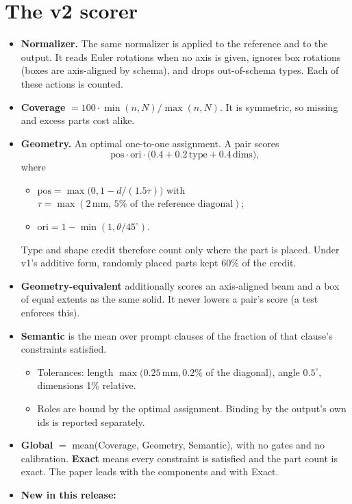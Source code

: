 \documentclass[10pt,a4paper]{article}
\begin{document}
\section{The v2 scorer}
\begin{itemize}
\item \textbf{Normalizer.} The same normalizer is applied to the reference and to the output. It reads Euler rotations when no axis is given, ignores box rotations (boxes are axis-aligned by schema), and drops out-of-schema types. Each of these actions is counted.
\item \textbf{Coverage} $=100\cdot\min(n,N)/\max(n,N)$. It is symmetric, so missing and excess parts cost alike.
\item \textbf{Geometry.} An optimal one-to-one assignment. A pair scores
  \[ \text{pos}\cdot\text{ori}\cdot\bigl(0.4+0.2\,\text{type}+0.4\,\text{dims}\bigr), \]
  where
  \begin{itemize}
  \item $\text{pos}=\max\!\bigl(0,1-d/(1.5\tau)\bigr)$ with $\tau=\max(2\,\text{mm},\,5\%\text{ of the reference diagonal})$;
  \item $\text{ori}=1-\min(1,\theta/45^\circ)$.
  \end{itemize}
  Type and shape credit therefore count only where the part is placed. Under v1's additive form, randomly placed parts kept 60\% of the credit.
\item \textbf{Geometry-equivalent} additionally scores an axis-aligned beam and a box of equal extents as the same solid. It never lowers a pair's score (a test enforces this).
\item \textbf{Semantic} is the mean over prompt clauses of the fraction of that clause's constraints satisfied.
  \begin{itemize}
  \item Tolerances: length $\max(0.25\,\text{mm}, 0.2\%$ of the diagonal$)$, angle $0.5^\circ$, dimensions 1\% relative.
  \item Roles are bound by the optimal assignment. Binding by the output's own ids is reported separately.
  \end{itemize}
\item \textbf{Global} $=$ mean(Coverage, Geometry, Semantic), with no gates and no calibration. \textbf{Exact} means every constraint is satisfied and the part count is exact. The paper leads with the components and with Exact.
\item \textbf{New in this release:}
  \begin{itemize}

\end{itemize}
\end{itemize}
\end{document}
